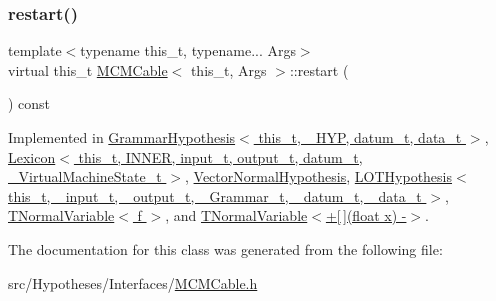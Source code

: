 \mbox{\label{class_m_c_m_cable_aa7017e18b4a1508bc4cff90fb82a8ec1}} 
\subsubsection{\texorpdfstring{restart()}{restart()}}
{\footnotesize\ttfamily template$<$typename this\+\_\+t, typename... Args$>$ \\
virtual this\+\_\+t \hyperlink{class_m_c_m_cable}{M\+C\+M\+Cable}$<$ this\+\_\+t, Args $>$\+::restart (\begin{DoxyParamCaption}{ }\end{DoxyParamCaption}) const\hspace{0.3cm}{\ttfamily [pure virtual]}}



Implemented in \hyperlink{class_grammar_hypothesis_a85c5aad5990900d4da6eca5a24deb3e6}{Grammar\+Hypothesis$<$ this\+\_\+t, \+\_\+\+H\+Y\+P, datum\+\_\+t, data\+\_\+t $>$}, \hyperlink{class_lexicon_af78f84c26c2b3593c505388a45ba6d19}{Lexicon$<$ this\+\_\+t, I\+N\+N\+E\+R, input\+\_\+t, output\+\_\+t, datum\+\_\+t, \+\_\+\+Virtual\+Machine\+State\+\_\+t $>$}, \hyperlink{class_vector_normal_hypothesis_aed2008aa5569f971373f99a97f33ba2c}{Vector\+Normal\+Hypothesis}, \hyperlink{class_l_o_t_hypothesis_ab058030e50b719fdbc84544aad712eed}{L\+O\+T\+Hypothesis$<$ this\+\_\+t, \+\_\+input\+\_\+t, \+\_\+output\+\_\+t, \+\_\+\+Grammar\+\_\+t, \+\_\+datum\+\_\+t, \+\_\+data\+\_\+t $>$}, \hyperlink{class_t_normal_variable_aacaa3c0962cf32dcee93f7e459cd0eac}{T\+Normal\+Variable$<$ f $>$}, and \hyperlink{class_t_normal_variable_aacaa3c0962cf32dcee93f7e459cd0eac}{T\+Normal\+Variable$<$+\mbox{[}$\,$\mbox{]}(float x) -\/$>$}.



The documentation for this class was generated from the following file\+:\begin{DoxyCompactItemize}
\item 
src/\+Hypotheses/\+Interfaces/\hyperlink{_m_c_m_cable_8h}{M\+C\+M\+Cable.\+h}\end{DoxyCompactItemize}

